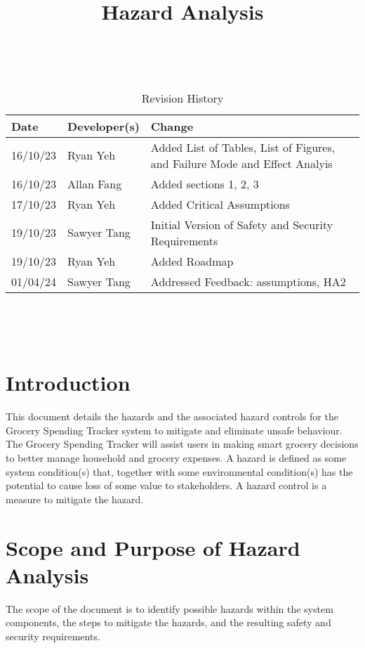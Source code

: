 \documentclass{article}
\title{Hazard Analysis\\\progname}
\author{\authname}
\date{}
\begin{document}
\maketitle
\thispagestyle{empty}

~\newpage


\begin{table}[hp]
\caption{Revision History} \label{TblRevisionHistory}
\begin{tabularx}{\textwidth}{llX}
\toprule
\textbf{Date} & \textbf{Developer(s)} & \textbf{Change}\\
\midrule
16/10/23 & Ryan Yeh & Added List of Tables, List of Figures, and Failure Mode and Effect Analyis\\
16/10/23 & Allan Fang & Added sections 1, 2, 3\\
17/10/23 & Ryan Yeh & Added Critical Assumptions\\
19/10/23 & Sawyer Tang & Initial Version of Safety and Security Requirements\\
19/10/23 & Ryan Yeh & Added Roadmap\\
01/04/24 & Sawyer Tang & Addressed Feedback: assumptions, HA2 \\
\bottomrule
\end{tabularx}
\end{table}

~\newpage

\tableofcontents

~\newpage

\listoftables

\listoffigures

\newpage


\section{Introduction}
This document details the hazards and the associated hazard controls for the Grocery Spending Tracker system to mitigate and eliminate unsafe behaviour. The Grocery Spending Tracker will assist users in making smart grocery decisions to better manage household and grocery expenses.  A hazard is defined as some system condition(s) that, together with some environmental condition(s) has the potential to cause loss of some value to stakeholders. A hazard control is a measure to mitigate the hazard.

\section{Scope and Purpose of Hazard Analysis}
The scope of the document is to identify possible hazards within the system components, the steps to mitigate the hazards, and the resulting safety and security requirements.
\end{document}
